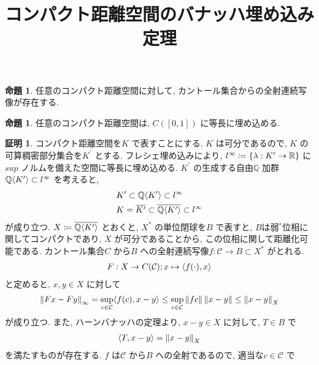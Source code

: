 \documentclass[10pt, fleqn, label-section=none]{bxjsarticle}
\title{コンパクト距離空間のバナッハ埋め込み定理}
\date{}
\author{}
\theoremstyle{definition}
\newtheorem{prop}[dfn]{命題}
\newtheorem*{pf*}{証明}
\newcommand{\cbra}[1]{\mleft\{#1\mright\}}
\newcommand{\tbra}[1]{\mleft\langle#1\mright\rangle}
\newcommand{\norm}[1]{\left\|#1\right\|}
\renewcommand{\;}{\, ; \,}
\begin{document}
\maketitle

\section{}


\begin{prop}任意のコンパクト距離空間に対して, カントール集合からの全射連続写像が存在する. 
\end{prop}

\begin{prop}
任意のコンパクト距離空間は, $C([0, 1])$ に等長に埋め込める. 
\end{prop}
\begin{pf*}コンパクト距離空間を$K$ で表すことにする. $K$ は可分であるので, $K$ の可算稠密部分集合を$K^\prime $ とする. フレシェ埋め込みにより, $l^\infty \coloneqq \cbra{\lambda : K^\prime \rightarrow \mathbb R}$ に$sup$ ノルムを備えた空間に等長に埋め込める.  $K^\prime$ の生成する自由$\mathbb Q$ 加群$\mathbb Q \tbra{K^\prime} \subset l^\infty$ 
を考えると, 
\begin{align*} &K^\prime \subset  \mathbb Q \tbra{K^\prime } \subset l^\infty 
\\&K = \overline{K^\prime} \subset \overline{\mathbb  Q \tbra{K^\prime } } \subset l^\infty
 \end{align*}
 が成り立つ. $X \coloneqq \overline{\mathbb  Q \tbra{K^\prime } } $ とおくと, $X^*$ の単位閉球を$B$ で表すと, $B$は弱$^*$位相に関してコンパクトであり, $X$ が可分であることから, この位相に関して距離化可能である.  カントール集合$C$ から$B$ への全射連続写像$f : \mathcal C \rightarrow B\subset X^* $ がとれる. 
 \begin{align*} F: X \rightarrow C(\mathcal C) ; x \mapsto \tbra{f (\cdot) , x } \end{align*}
 と定めると, $x, y \in X$ に対して
 \begin{align*} \norm{Fx - Fy}_{\infty} = \sup_{c \in \mathcal C} \tbra{f (c) , x - y  } \leq \sup_{c \in \mathcal C} \norm{fc} \norm{x- y} \leq \norm{x - y}_X  \end{align*}
 が成り立つ. また, ハーンバナッハの定理より, $x - y \in X$ に対して, $T \in B$ で
 \begin{align*} \tbra{T, x- y} = \norm{x - y}_X \end{align*}
 を満たすものが存在する. $f$ は$\mathcal C$ から$B$ への全射であるので, 適当な$c \in \mathcal C$ で

\end{pf*}
\end{document}
